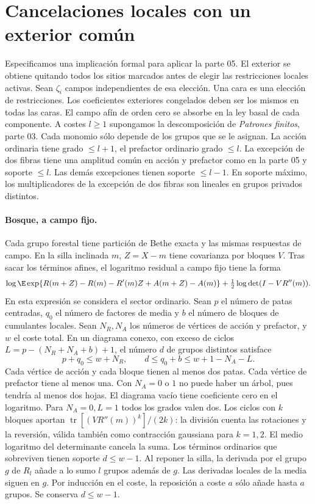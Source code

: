 \section{Cancelaciones locales con un exterior común}
Especificamos una implicación formal para aplicar la parte 05. El exterior se obtiene
quitando todos los sitios marcados antes de elegir las restricciones locales activas.
Sean $\zeta_i$ campos independientes de esa elección. Una cara es una elección de
restricciones. Los coeficientes exteriores congelados deben ser los mismos en todas las caras.
El campo afín de orden cero se absorbe en la ley basal de cada componente.
A costes $l\ge1$ supongamos la descomposición de \emph{Patrones finitos}, parte 03.
Cada monomio sólo depende de los grupos que se le asignan. La acción ordinaria tiene grado
$\le l+1$, el prefactor ordinario grado $\le l$. La excepción de dos fibras tiene una
amplitud común en acción y prefactor como en la parte 05 y soporte $\le l$.
Las demás excepciones tienen soporte $\le l-1$. En soporte máximo, los multiplicadores
de la excepción de dos fibras son lineales en grupos privados distintos.
\paragraph{Bosque, a campo fijo.}
Cada grupo forestal tiene partición de Bethe exacta y las mismas respuestas de campo.
En la silla inclinada $m$, $Z=X-m$ tiene covarianza por bloques $V$.
Tras sacar los términos afines, el logaritmo residual a campo fijo tiene la forma
\[
 \log\E\exp\{R(m+Z)-R(m)-R'(m)Z+A(m+Z)-A(m)\}
   +\tfrac12\log\det(I-VR''(m)).
\]
En esta expresión se considera el sector ordinario. Sean $p$ el número de patas centradas,
$q_0$ el número de factores de media y $b$ el número de bloques de cumulantes locales.
Sean $N_R,N_A$ los números de vértices de acción y prefactor, y $w$ el coste total.
En un diagrama conexo, con exceso de ciclos $L=p-(N_R+N_A+b)+1$, el número $d$
de grupos distintos satisface
\[
       p+q_0\le w+N_R,\qquad d\le q_0+b\le w+1-N_A-L .
\]
Cada vértice de acción y cada bloque tienen al menos dos patas. Cada vértice de
prefactor tiene al menos una. Con $N_A=0$ o $1$ no puede haber un árbol, pues
tendría al menos dos hojas. El diagrama vacío tiene coeficiente cero en el logaritmo.
Para $N_A=0,L=1$ todos los grados valen dos. Los ciclos con $k$ bloques aportan
$\operatorname{tr}[(VR''(m))^k]/(2k)$: la división cuenta las rotaciones y la
reversión, válida también como contracción gaussiana para $k=1,2$.
El medio logaritmo del determinante cancela la suma. Los términos ordinarios
que sobreviven tienen soporte $d\le w-1$.
Al reponer la silla, la derivada por el grupo $g$ de $R_l$ añade a lo sumo $l$
grupos además de $g$. Las derivadas locales de la media siguen en $g$. Por inducción
en el coste, la reposición a coste $a$ sólo añade hasta $a$ grupos. Se conserva $d\le w-1$.
